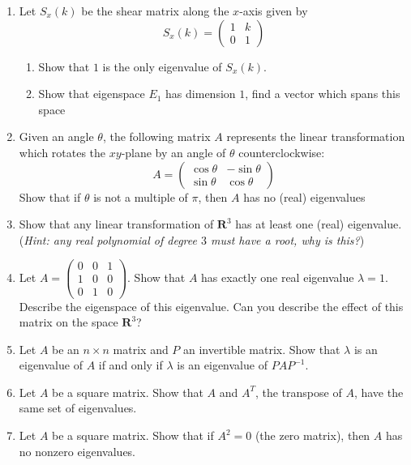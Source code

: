\documentclass[12pt]{article}
\numberwithin{equation}{subsection}
\numberwithin{figure}{subsection}
\theoremstyle{note}
\begin{document}
\begin{enumerate}[label=\arabic*.]
	\item Let $S_x(k)$ be the shear matrix along the $x$-axis given by \[S_x(k)= \begin{pmatrix} 1& k\\ 0 & 1\end{pmatrix} \]
	\begin{enumerate}
		\item Show that $1$ is the only eigenvalue of $S_x(k)$.
		\item Show that eigenspace $E_1$ has dimension $1$, find a vector which spans this space
	\end{enumerate}
	\item \label{rotation-matrices} Given an angle $\theta$, the following matrix $A$ represents the linear transformation which rotates the $xy$-plane by an angle of $\theta$ counterclockwise: \[A=\begin{pmatrix} \cos \theta & -\sin\theta \\ \sin\theta & \cos \theta \end{pmatrix}\] Show that if $\theta$ is not a multiple of $\pi$, then  $A$ has no (real) eigenvalues
	\item \label{princ-axis} Show that any linear transformation of $\mathbf{R}^3$ has at least one (real) eigenvalue. (\textit{Hint: any real polynomial of degree $3$ must have a root, why is this?})
	
	\item Let $A=\begin{pmatrix} 0 & 0 & 1 \\ 1 & 0 & 0 \\ 0 & 1 & 0 \end{pmatrix}$. Show that $A$ has exactly one real eigenvalue $\lambda=1$. Describe the eigenspace of this eigenvalue. Can you describe the effect of this matrix on the space $\mathbf{R}^3$?
	\item Let $A$ be an $n\times n$ matrix and $P$ an invertible matrix. Show that $\lambda$ is an eigenvalue of $A$ if and only if $\lambda$ is an eigenvalue of $PAP^{-1}$.
	
	\item \label{ex-transpote} Let $A$ be a square matrix. Show that $A$ and $A^T$, the transpose of $A$, have the same set of eigenvalues. 
	
	\item Let $A$ be a square matrix. Show that if $A^2=0$ (the zero matrix), then $A$ has no nonzero eigenvalues. 
	

\end{enumerate}
\end{document}
